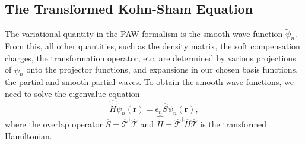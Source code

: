 \documentclass[a4paper]{article}
\newcommand{\s}[1]{\tilde{#1}}
\newcommand{\ws}[1]{\widetilde{#1}}
\newcommand{\h}[1]{\hat{#1}}
\newcommand{\wh}[1]{\widehat{#1}}
\newcommand{\br}{\mathbf{r}}
\newcommand{\T}{\hat{\mathcal{T}}}
\newcommand{\Ham}{\widehat{H}}
\begin{document}
\subsection{The Transformed Kohn-Sham Equation}
The variational quantity in the PAW formalism is the smooth wave
function $\s{\psi}_n$. From this, all other quantities, such as the
density matrix, the soft compensation charges, the transformation
operator, etc. are determined by various projections of $\s{\psi}_n$
onto the projector functions, and expansions in our chosen basis
functions, the partial and smooth partial waves. To obtain the smooth
wave functions, we need to solve the eigenvalue equation
%
\begin{equation}\label{eq: transformed KS}
  \wh{\ws{H}} \s{\psi}_n(\br) = \epsilon_n \h{S}\s{\psi}_n(\br),
\end{equation}
%
where the overlap operator $\h{S} = \T^\dagger \T$ and $\wh{\ws{H}} =
\T^\dagger \Ham \T$ is the transformed Hamiltonian.
\end{document}
